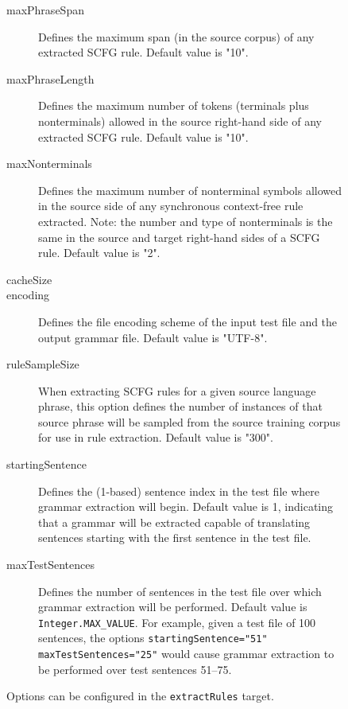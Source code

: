 \documentclass{pbml}
\begin{document}
\begin{figure}
\begin{description}

	\item[maxPhraseSpan] Defines the maximum span (in the source corpus) of any extracted SCFG rule. Default value is "10".

	\item[maxPhraseLength] Defines the maximum number of tokens (terminals plus nonterminals) allowed in the source right-hand side of any extracted SCFG rule. Default value is "10".

	\item[maxNonterminals] Defines the maximum number of nonterminal symbols allowed in the source side of any synchronous context-free rule extracted. Note: the number and type of nonterminals is the same in the source and target right-hand sides of a SCFG rule. Default value is "2".

	\item[cacheSize]

	\item[encoding] Defines the file encoding scheme of the input test file and the output grammar file. Default value is "UTF-8".


	\item[ruleSampleSize] When extracting SCFG rules for a given source language phrase, this option defines the number of instances of that source phrase will be sampled from the source training corpus for use in rule extraction. Default value is "300".
	
	\item[startingSentence] Defines the (1-based) sentence index in the test file where grammar extraction will begin. Default value is 1, indicating that a grammar will be extracted capable of translating sentences starting with the first sentence in the test file.

	\item[maxTestSentences] Defines the number of sentences in the test file over which grammar extraction will be performed. Default value is {\tt Integer.MAX\_VALUE}. For example, given a test file of 100 sentences, the options {\tt startingSentence="51"  maxTestSentences="25"} would cause grammar extraction to be performed over test sentences 51--75.

\end{description}
\caption{Options can be configured in the {\tt extractRules} target.}
\end{figure}
\end{document}
